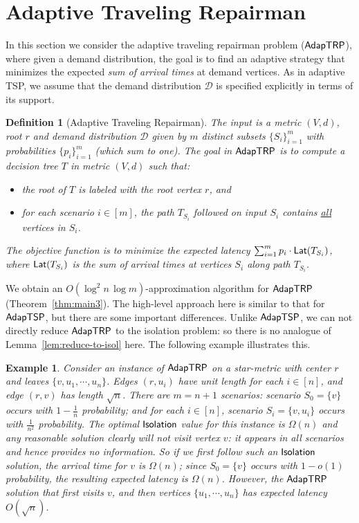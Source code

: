 \documentclass[11pt]{article}
\newtheorem{definition}{Definition}
\newtheorem{example}{Example}
\def\lat{{\sf Lat}\xspace}
\def\ds{\mathcal{D}}
\def\isoprob{\ensuremath{{\sf Isolation}}\xspace}
\def\stsp{\ensuremath{{\sf AdapTSP}}\xspace}
\def\strp{\ensuremath{{\sf AdapTRP}}\xspace}
\begin{document}
\section{Adaptive Traveling Repairman}
\label{sec:strp}

In this section we consider the adaptive traveling repairman problem (\strp), where given a demand distribution, the goal is to
find an adaptive strategy that minimizes the expected {\em sum  of arrival times} at demand vertices. As in adaptive TSP, we assume that the demand distribution $\ds$ is specified explicitly in terms of its support. 


\smallskip 
\begin{definition}[Adaptive Traveling Repairman]
The input is a metric $(V,d)$, root $r$ and demand distribution $\ds$ given by $m$ distinct subsets $\{S_i\}_{i=1}^m$ with  probabilities $\{p_i\}_{i=1}^m$ (which sum to one). The goal in \strp is to compute a decision tree $T$ in
metric $(V,d)$ such that:
  \begin{itemize}
  \item the root of $T$ is labeled with the root vertex $r$, and
  \item for each scenario $i\in[m]$, the path $T_{S_i}$ followed on input $S_i$ contains \underline{all} vertices in $S_{i}$.
  \end{itemize}
  The objective function is to minimize the expected latency
  $\sum_{i=1}^m p_i \cdot \lat(T_{S_i})$, where $\lat(T_{S_i})$ is the sum of arrival times at vertices $S_i$ along path $T_{S_i}$.
\end{definition}

\smallskip

We obtain an $O(\log^2n\,\log m)$-approximation algorithm for \strp (Theorem~\ref{thm:main3}). The high-level approach here is similar to that for \stsp, but there are some important differences. Unlike \stsp, we can not directly reduce \strp to the isolation problem: so there is no analogue of Lemma~\ref{lem:reduce-to-isol} here.  The following example illustrates this.

\smallskip

\begin{example}
Consider an instance of \strp 
on a star-metric with center $r$ and leaves $\{v, u_1,\cdots,u_n\}$. Edges $(r,u_i)$ have unit length for each $i\in[n]$, and edge $(r,v)$ has length $\sqrt{n}$. There
are $m=n+1$ scenarios: scenario $S_0=\{v\}$ occurs with $1-\frac1n$ probability; and for each $i\in[n]$, scenario
$S_i=\{v,u_i\}$ occurs with $\frac1{n^2}$ probability. The optimal \isoprob value for this instance is $\Omega(n)$ and any reasonable solution clearly will not visit vertex $v$:  it appears in all scenarios and hence provides no information. So if we first follow such an \isoprob solution, the
arrival time for $v$ is $\Omega(n)$; 
since $S_0=\{v\}$ occurs with $1-o(1)$ probability, the
resulting expected latency is $\Omega(n)$. However, the \strp solution that first visits $v$, and then vertices
$\{u_1,\cdots,u_n\}$ has expected latency $O(\sqrt{n})$. 
\end{example}
\smallskip
\end{document}
